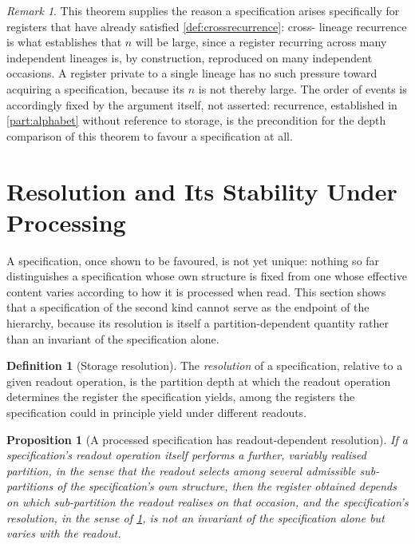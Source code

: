 \documentclass[11pt,twocolumn,a4paper]{article}
\theoremstyle{plain}
\newtheorem{proposition}[theorem]{Proposition}
\theoremstyle{definition}
\newtheorem{definition}[theorem]{Definition}
\theoremstyle{remark}
\newtheorem{remark}[theorem]{Remark}
\begin{document}
\begin{remark}
This theorem supplies the reason a specification arises specifically for
registers that have already satisfied \cref{def:crossrecurrence}: cross-
lineage recurrence is what establishes that $n$ will be large, since a
register recurring across many independent lineages is, by construction,
reproduced on many independent occasions. A register private to a single
lineage has no such pressure toward acquiring a specification, because its
$n$ is not thereby large. The order of events is accordingly fixed by the
argument itself, not asserted: recurrence, established in
\cref{part:alphabet} without reference to storage, is the precondition for
the depth comparison of this theorem to favour a specification at all.
\end{remark}

\section{Resolution and Its Stability Under Processing}
\label{sec:resolution-stability}

A specification, once shown to be favoured, is not yet unique: nothing so
far distinguishes a specification whose own structure is fixed from one
whose effective content varies according to how it is processed when
read. This section shows that a specification of the second kind cannot
serve as the endpoint of the hierarchy, because its resolution is itself a
partition-dependent quantity rather than an invariant of the specification
alone.

\begin{definition}[Storage resolution]
\label{def:storage-resolution}
The \emph{resolution} of a specification, relative to a given readout
operation, is the partition depth at which the readout operation
determines the register the specification yields, among the registers the
specification could in principle yield under different readouts.
\end{definition}

\begin{proposition}[A processed specification has readout-dependent
resolution]
\label{prop:processed-resolution}
If a specification's readout operation itself performs a further,
variably realised partition, in the sense that the readout selects among
several admissible sub-partitions of the specification's own structure,
then the register obtained depends on which sub-partition the readout
realises on that occasion, and the specification's resolution, in the
sense of \cref{def:storage-resolution}, is not an invariant of the
specification alone but varies with the readout.
\end{proposition}
\end{document}
